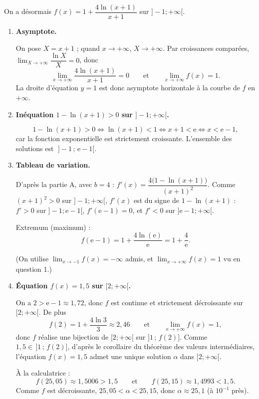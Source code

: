 \documentclass[11pt,a4paper]{article}
\newcommand{\e}{\mathrm{e}}
\begin{document}
On a désormais $f(x) = 1 + \dfrac{4\ln(x+1)}{x+1}$ sur $]-1;+\infty[$.

\begin{enumerate}

\item \textbf{Asymptote.}

On pose $X = x+1$ ; quand $x\to+\infty$, $X\to+\infty$. Par croissances comparées,
$\lim_{X\to+\infty}\dfrac{\ln X}{X}=0$, donc
\[
\lim_{x\to+\infty} \dfrac{4\ln(x+1)}{x+1} = 0
\qquad\text{et}\qquad
\lim_{x\to+\infty} f(x) = 1.
\]
La droite d'équation $y=1$ est donc asymptote horizontale à la courbe de $f$ en $+\infty$.

\item \textbf{Inéquation $1-\ln(x+1)>0$ sur $]-1;+\infty[$.}

\[
1-\ln(x+1)>0 \iff \ln(x+1)<1 \iff x+1<\e \iff x<\e-1,
\]
car la fonction exponentielle est strictement croissante. L'ensemble des solutions est
$\;]-1\,;\,\e-1[$.

\item \textbf{Tableau de variation.}

D'après la partie A, avec $b=4$ : $f'(x)=\dfrac{4\bigl(1-\ln(x+1)\bigr)}{(x+1)^2}$.
Comme $(x+1)^2>0$ sur $]-1;+\infty[$, $f'(x)$ est du signe de $1-\ln(x+1)$ :
$f'>0$ sur $]-1;\e-1[$, $f'(\e-1)=0$, et $f'<0$ sur $]\e-1;+\infty[$.

Extremum (maximum) :
\[
f(\e-1) = 1 + \dfrac{4\ln(\e)}{\e} = 1+\dfrac{4}{\e}.
\]

\begin{center}
\end{center}

(On utilise $\lim_{x\to-1}f(x)=-\infty$ admis, et $\lim_{x\to+\infty}f(x)=1$ vu en question 1.)

\item \textbf{Équation $f(x)=1{,}5$ sur $[2;+\infty[$.}

On a $2>\e-1\approx 1{,}72$, donc $f$ est continue et strictement décroissante sur $[2;+\infty[$.
De plus
\[
f(2) = 1+\dfrac{4\ln 3}{3}\approx 2{,}46 \qquad\text{et}\qquad \lim_{x\to+\infty}f(x)=1,
\]
donc $f$ réalise une bijection de $[2;+\infty[$ sur $]1\,;\,f(2)]$.
Comme $1{,}5\in\,]1\,;\,f(2)]$, d'après le corollaire du théorème des valeurs intermédiaires,
l'équation $f(x)=1{,}5$ admet une unique solution $\alpha$ dans $[2;+\infty[$.

À la calculatrice :
\[
f(25{,}05)\approx 1{,}5006>1{,}5 \qquad\text{et}\qquad f(25{,}15)\approx 1{,}4993<1{,}5.
\]
Comme $f$ est décroissante, $25{,}05<\alpha<25{,}15$, donc $\alpha\approx 25{,}1$ (à $10^{-1}$ près).
\end{enumerate}
\end{document}
